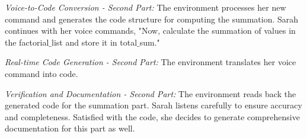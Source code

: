 {\em Voice-to-Code Conversion - Second Part:} The environment
processes her new command and generates the code structure for
computing the summation.
Sarah continues with her voice commands, "Now, calculate the summation
of values in the factorial$\_$list and store it in total$\_$sum."

{\em Real-time Code Generation - Second Part:}
The environment translates her voice command into code.

{\em Verification and Documentation - Second Part:} The environment
reads back the generated code for the summation part. Sarah listens
carefully to ensure accuracy and completeness. Satisfied with the
code, she decides to generate comprehensive documentation for this
part as well.





